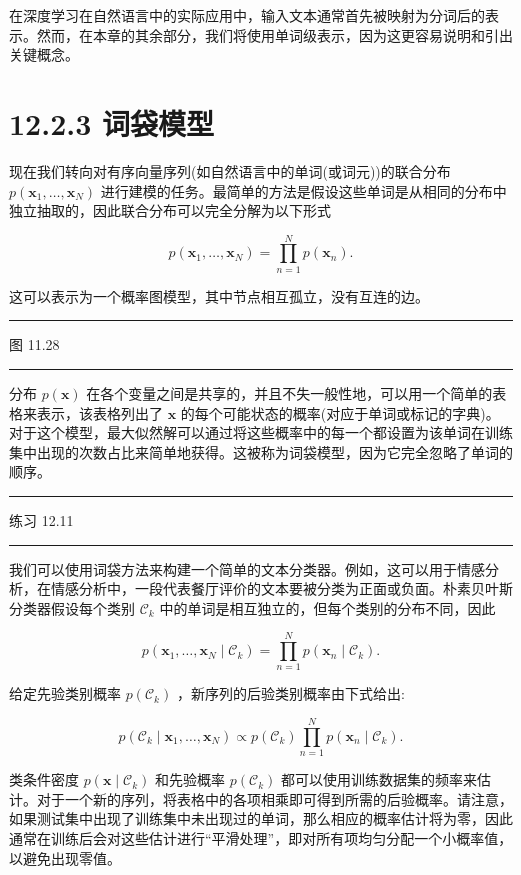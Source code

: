 \documentclass[10pt]{report}
\newcommand{\HRule}{\begin{center}\rule{0.9\linewidth}{0.2mm}\end{center}}
\begin{document}
在深度学习在自然语言中的实际应用中，输入文本通常首先被映射为分词后的表示。然而，在本章的其余部分，我们将使用单词级表示，因为这更容易说明和引出关键概念。

\section*{12.2.3 词袋模型}

现在我们转向对有序向量序列(如自然语言中的单词(或词元))的联合分布 \(p\left( {{\mathbf{x}}_{1},\ldots ,{\mathbf{x}}_{N}}\right)\) 进行建模的任务。最简单的方法是假设这些单词是从相同的分布中独立抽取的，因此联合分布可以完全分解为以下形式

\[
p\left( {{\mathbf{x}}_{1},\ldots ,{\mathbf{x}}_{N}}\right)  = \mathop{\prod }\limits_{{n = 1}}^{N}p\left( {\mathbf{x}}_{n}\right) . \tag{12.28}
\]

这可以表示为一个概率图模型，其中节点相互孤立，没有互连的边。

\HRule

图 11.28

\HRule

分布 \(p\left( \mathbf{x}\right)\) 在各个变量之间是共享的，并且不失一般性地，可以用一个简单的表格来表示，该表格列出了 \(\mathbf{x}\) 的每个可能状态的概率(对应于单词或标记的字典)。对于这个模型，最大似然解可以通过将这些概率中的每一个都设置为该单词在训练集中出现的次数占比来简单地获得。这被称为词袋模型，因为它完全忽略了单词的顺序。

\HRule

练习 12.11

\HRule

我们可以使用词袋方法来构建一个简单的文本分类器。例如，这可以用于情感分析，在情感分析中，一段代表餐厅评价的文本要被分类为正面或负面。朴素贝叶斯分类器假设每个类别 \({\mathcal{C}}_{k}\) 中的单词是相互独立的，但每个类别的分布不同，因此

\[
p\left( {{\mathbf{x}}_{1},\ldots ,{\mathbf{x}}_{N} \mid  {\mathcal{C}}_{k}}\right)  = \mathop{\prod }\limits_{{n = 1}}^{N}p\left( {{\mathbf{x}}_{n} \mid  {\mathcal{C}}_{k}}\right) . \tag{12.29}
\]

给定先验类别概率 \(p\left( {\mathcal{C}}_{k}\right)\) ，新序列的后验类别概率由下式给出:

\[
p\left( {{\mathcal{C}}_{k} \mid  {\mathbf{x}}_{1},\ldots ,{\mathbf{x}}_{N}}\right)  \propto  p\left( {\mathcal{C}}_{k}\right) \mathop{\prod }\limits_{{n = 1}}^{N}p\left( {{\mathbf{x}}_{n} \mid  {\mathcal{C}}_{k}}\right) . \tag{12.30}
\]

类条件密度 \(p\left( {\mathbf{x} \mid  {\mathcal{C}}_{k}}\right)\) 和先验概率 \(p\left( {\mathcal{C}}_{k}\right)\) 都可以使用训练数据集的频率来估计。对于一个新的序列，将表格中的各项相乘即可得到所需的后验概率。请注意，如果测试集中出现了训练集中未出现过的单词，那么相应的概率估计将为零，因此通常在训练后会对这些估计进行“平滑处理”，即对所有项均匀分配一个小概率值，以避免出现零值。
\end{document}
